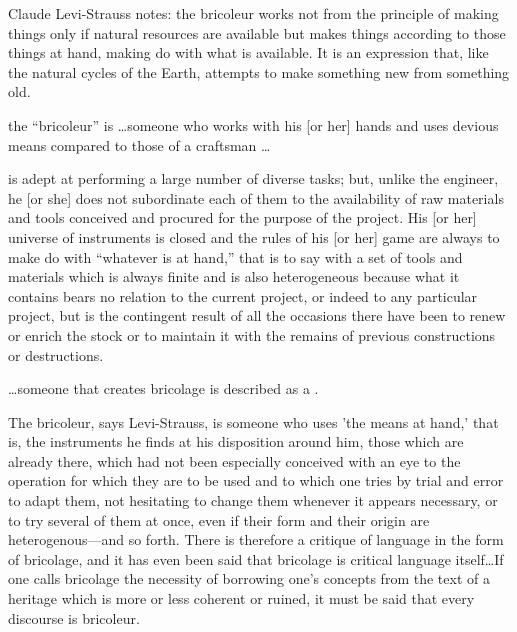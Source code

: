 Claude Levi-Strauss notes: the bricoleur works not from the principle of making things only if natural resources are available but makes things according to those things at hand, making do with what is available. It is an expression that, like the natural cycles of the Earth, attempts to make something new from something old. \cite{levi1966savage}

the “bricoleur” is \ldots someone who works with his [or her] hands and uses devious means compared to those of a craftsman \ldots \cite{levi1966savage}

\begin{blockquote}
[He or she] is adept at performing a large number of diverse tasks; but, unlike the engineer, he [or she] does not subordinate each of them to the availability of raw materials and tools conceived and procured for the purpose of the project. His [or her] universe of instruments is closed and the rules of his [or her] game are always to make do with “whatever is at hand,” that is to say with a set of tools and materials which is always finite and is also heterogeneous because what it contains bears no relation to the current project, or indeed to any particular project, but is the contingent result of all the occasions there have been to renew or enrich the stock or to maintain it with the remains of previous constructions or destructions.\cite{levi1966savage}
\end{blockquote}

\ldots someone that creates bricolage is described as a . 

\begin{blockquote}
The bricoleur, says Levi-Strauss, is someone who uses 'the means at hand,' that is, the instruments he finds at his disposition around him, those which are already there, which had not been especially conceived with an eye to the operation for which they are to be used and to which one tries by trial and error to adapt them, not hesitating to change them whenever it appears necessary, or to try several of them at once, even if their form and their origin are heterogenous---and so forth. There is therefore a critique of language in the form of bricolage, and it has even been said that bricolage is critical language itself\ldots If one calls bricolage the necessity of borrowing one's concepts from the text of a heritage which is more or less coherent or ruined, it must be said that every discourse is bricoleur.\cite{derrida1993structure}
\end{blockquote}

